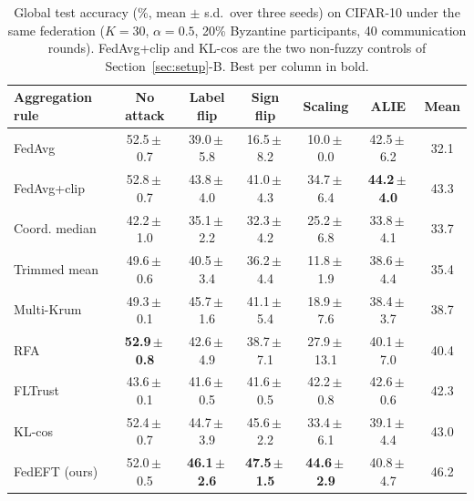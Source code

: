 \begin{table}[!t]
\centering
\caption{Global test accuracy (\%, mean $\pm$ s.d.\ over three seeds) on CIFAR-10 under the same federation ($K=30$, $\alpha=0.5$, 20\% Byzantine participants, 40 communication rounds). FedAvg+clip and KL-cos are the two non-fuzzy controls of Section~\ref{sec:setup}-B. Best per column in bold.}
\label{tab:main_cifar}
\setlength{\tabcolsep}{4.2pt}
\begin{tabular}{lcccccc}
\hline
Aggregation rule & No attack & Label flip & Sign flip & Scaling & ALIE & \textbf{Mean} \\
\hline
FedAvg & 52.5\,$\pm$\,0.7 & 39.0\,$\pm$\,5.8 & 16.5\,$\pm$\,8.2 & 10.0\,$\pm$\,0.0 & 42.5\,$\pm$\,6.2 & 32.1 \\
FedAvg+clip & 52.8\,$\pm$\,0.7 & 43.8\,$\pm$\,4.0 & 41.0\,$\pm$\,4.3 & 34.7\,$\pm$\,6.4 & \textbf{44.2\,$\pm$\,4.0} & 43.3 \\
Coord. median & 42.2\,$\pm$\,1.0 & 35.1\,$\pm$\,2.2 & 32.3\,$\pm$\,4.2 & 25.2\,$\pm$\,6.8 & 33.8\,$\pm$\,4.1 & 33.7 \\
Trimmed mean & 49.6\,$\pm$\,0.6 & 40.5\,$\pm$\,3.4 & 36.2\,$\pm$\,4.4 & 11.8\,$\pm$\,1.9 & 38.6\,$\pm$\,4.4 & 35.4 \\
Multi-Krum & 49.3\,$\pm$\,0.1 & 45.7\,$\pm$\,1.6 & 41.1\,$\pm$\,5.4 & 18.9\,$\pm$\,7.6 & 38.4\,$\pm$\,3.7 & 38.7 \\
RFA & \textbf{52.9\,$\pm$\,0.8} & 42.6\,$\pm$\,4.9 & 38.7\,$\pm$\,7.1 & 27.9\,$\pm$\,13.1 & 40.1\,$\pm$\,7.0 & 40.4 \\
FLTrust & 43.6\,$\pm$\,0.1 & 41.6\,$\pm$\,0.5 & 41.6\,$\pm$\,0.5 & 42.2\,$\pm$\,0.8 & 42.6\,$\pm$\,0.6 & 42.3 \\
KL-cos & 52.4\,$\pm$\,0.7 & 44.7\,$\pm$\,3.9 & 45.6\,$\pm$\,2.2 & 33.4\,$\pm$\,6.1 & 39.1\,$\pm$\,4.4 & 43.0 \\
\hline
FedEFT (ours) & 52.0\,$\pm$\,0.5 & \textbf{46.1\,$\pm$\,2.6} & \textbf{47.5\,$\pm$\,1.5} & \textbf{44.6\,$\pm$\,2.9} & 40.8\,$\pm$\,4.7 & 46.2 \\
\hline
\end{tabular}
\end{table}
